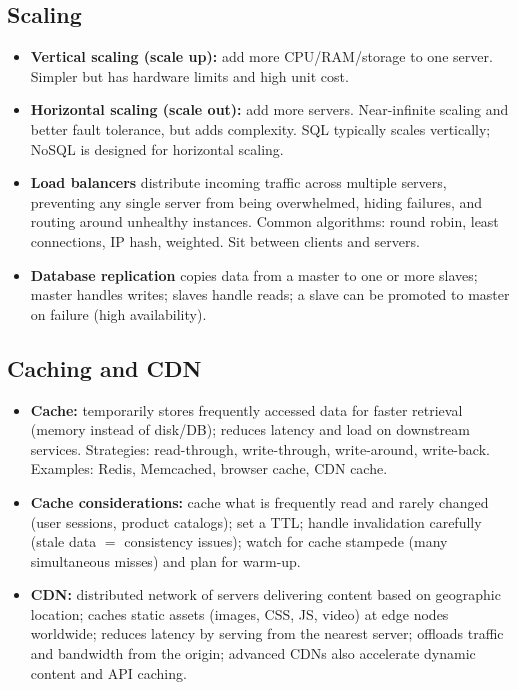 \documentclass[hidelinks]{article}
\begin{document}
\subsection{Scaling}
\begin{itemize}
  \item \textbf{Vertical scaling (scale up):} add more CPU/RAM/storage to one server. Simpler but
        has hardware limits and high unit cost.
  \item \textbf{Horizontal scaling (scale out):} add more servers. Near-infinite scaling and better
        fault tolerance, but adds complexity. SQL typically scales vertically; NoSQL is designed for
        horizontal scaling.
  \item \textbf{Load balancers} distribute incoming traffic across multiple servers, preventing any
        single server from being overwhelmed, hiding failures, and routing around unhealthy instances.
        Common algorithms: round robin, least connections, IP hash, weighted. Sit between clients and
        servers.
  \item \textbf{Database replication} copies data from a master to one or more slaves; master handles
        writes; slaves handle reads; a slave can be promoted to master on failure (high availability).
\end{itemize}

\subsection{Caching and CDN}
\begin{itemize}
  \item \textbf{Cache:} temporarily stores frequently accessed data for faster retrieval (memory instead
        of disk/DB); reduces latency and load on downstream services.
        Strategies: read-through, write-through, write-around, write-back.
        Examples: Redis, Memcached, browser cache, CDN cache.
  \item \textbf{Cache considerations:} cache what is frequently read and rarely changed (user sessions,
        product catalogs); set a TTL; handle invalidation carefully (stale data $=$ consistency issues);
        watch for cache stampede (many simultaneous misses) and plan for warm-up.
  \item \textbf{CDN:} distributed network of servers delivering content based on geographic location;
        caches static assets (images, CSS, JS, video) at edge nodes worldwide; reduces latency by
        serving from the nearest server; offloads traffic and bandwidth from the origin; advanced CDNs
        also accelerate dynamic content and API caching.
\end{itemize}
\end{document}
